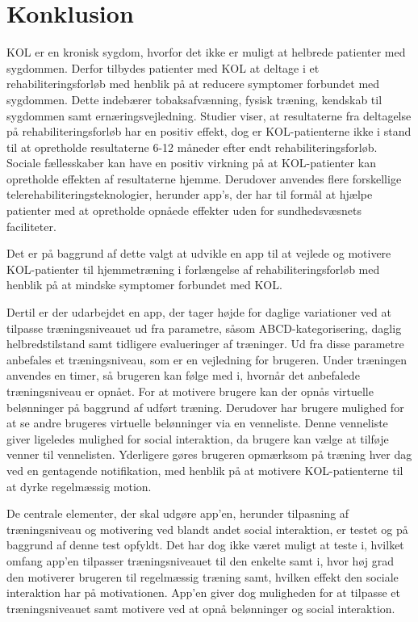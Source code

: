 \section{Konklusion}
KOL er en kronisk sygdom, hvorfor det ikke er muligt at helbrede patienter med sygdommen. Derfor tilbydes patienter med KOL at deltage i et rehabiliteringsforløb med henblik på at reducere symptomer forbundet med sygdommen. Dette indebærer tobaksafvænning, fysisk træning, kendskab til sygdommen samt ernæringsvejledning. Studier viser, at resultaterne fra deltagelse på rehabiliteringsforløb har en positiv effekt, dog er KOL-patienterne ikke i stand til at opretholde resultaterne 6-12 måneder efter endt rehabiliteringsforløb. Sociale fællesskaber kan have en positiv virkning på at KOL-patienter kan opretholde effekten af resultaterne hjemme. Derudover anvendes flere forskellige telerehabiliteringsteknologier, herunder app’s, der har til formål at hjælpe patienter med at opretholde opnåede effekter uden for sundhedsvæsnets faciliteter. 

Det er på baggrund af dette valgt at udvikle en app til at vejlede og motivere KOL-patienter til hjemmetræning i forlængelse af rehabiliteringsforløb med henblik på at mindske symptomer forbundet med KOL.

Dertil er der udarbejdet en app, der tager højde for daglige variationer ved at tilpasse træningsniveauet ud fra parametre, såsom ABCD-kategorisering, daglig helbredstilstand samt tidligere evalueringer af træninger. Ud fra disse parametre anbefales et træningsniveau, som er en vejledning for brugeren. Under træningen anvendes en timer, så brugeren kan følge med i, hvornår det anbefalede træningsniveau er opnået. For at motivere brugere kan der opnås virtuelle belønninger på baggrund af  udført træning. Derudover har brugere mulighed for at se andre brugeres virtuelle belønninger via en venneliste. Denne venneliste giver ligeledes mulighed for social interaktion, da brugere kan vælge at tilføje venner til vennelisten. Yderligere gøres brugeren opmærksom på træning hver dag ved en gentagende notifikation, med henblik på at motivere KOL-patienterne til at dyrke regelmæssig motion.  

De centrale elementer, der skal udgøre app’en, herunder tilpasning af træningsniveau og motivering ved blandt andet social interaktion, er testet og på baggrund af denne test opfyldt. Det har dog ikke været muligt at teste i, hvilket omfang app’en tilpasser træningsniveauet til den enkelte samt i, hvor høj grad den motiverer brugeren til regelmæssig træning samt, hvilken effekt den sociale interaktion har på motivationen. App’en giver dog muligheden for at tilpasse et træningsniveauet samt motivere ved at opnå belønninger og social interaktion. 

